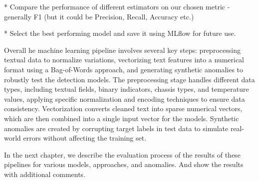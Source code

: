 * Compare the performance of different estimators on our chosen metric - generally 
 F1 (but it could be Precision, Recall, Accuracy etc.)

 * Select the best performing model and save it using MLflow for future use.
\enditems


Overall he machine learning pipeline involves several key steps: preprocessing textual data to normalize variations, vectorizing text features into a numerical format using a Bag-of-Words approach, and generating synthetic anomalies to robustly test the detection models. The preprocessing stage handles different data types, including textual fields, binary indicators, chassis types, and temperature values, applying specific normalization and encoding techniques to ensure data consistency. Vectorization converts cleaned text into sparse numerical vectors, which are then combined into a single input vector for the models. Synthetic anomalies are created by corrupting target labels in test data to simulate real-world errors without affecting the training set.

In the next chapter, we describe the evaluation process of the results of these pipelines for various models, approaches, and anomalies. And show the results with additional comments.